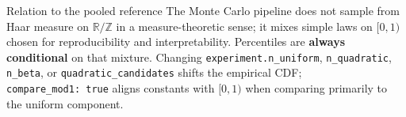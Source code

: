\documentclass[
  ignorenonframetext,
]{beamer}
\begin{document}
\begin{frame}[fragile]{Relation to the pooled reference}
\protect{}\label{relation-to-the-pooled-reference}
The Monte Carlo pipeline does not sample from Haar measure on
\(\mathbb{R}/\mathbb{Z}\) in a measure-theoretic sense; it mixes simple
laws on \([0,1)\) chosen for reproducibility and interpretability.
Percentiles are \textbf{always conditional} on that mixture. Changing
\texttt{experiment.n\_uniform}, \texttt{n\_quadratic}, \texttt{n\_beta},
or \texttt{quadratic\_candidates} shifts the empirical CDF;
\texttt{compare\_mod1:\ true} aligns constants with \([0,1)\) when
comparing primarily to the uniform component.
\end{frame}
\end{document}
